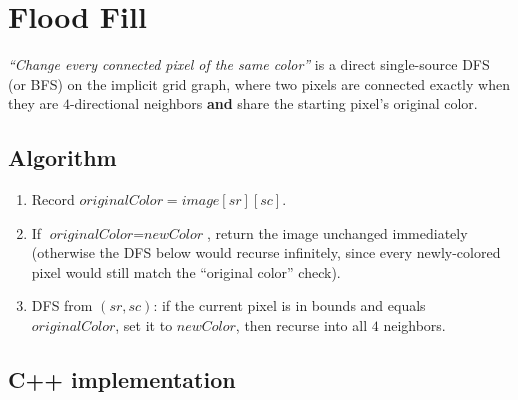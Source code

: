 \section{Flood Fill}
\label{sec:graph-flood-fill}


\begin{patternbox}
\emph{``Change every connected pixel of the same color''} is a direct
single-source DFS (or BFS) on the implicit grid graph, where two
pixels are connected exactly when they are $4$-directional neighbors
\textbf{and} share the starting pixel's original color.
\end{patternbox}

\subsection*{Algorithm}

\begin{enumerate}
  \item Record $\textit{originalColor} = \textit{image}[\textit{sr}][\textit{sc}]$.
  \item If $\textit{originalColor} = \textit{newColor}$, return the
        image unchanged immediately (otherwise the DFS below would
        recurse infinitely, since every newly-colored pixel would
        still match the ``original color'' check).
  \item DFS from $(\textit{sr},\textit{sc})$: if the current pixel is
        in bounds and equals $\textit{originalColor}$, set it to
        $\textit{newColor}$, then recurse into all $4$ neighbors.
\end{enumerate}

\subsection*{C++ implementation}

